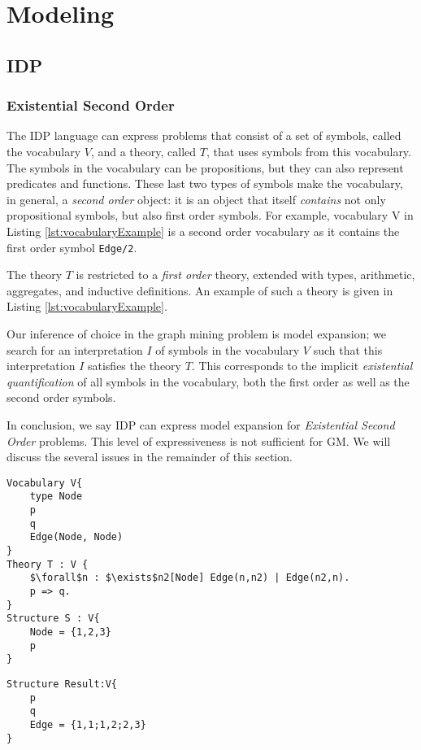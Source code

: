\section{Modeling}\label{sec:modeling}
\subsection{IDP}
\subsubsection{Existential Second Order}
The IDP language can express problems that consist of a set of symbols, called the vocabulary $V$, and a theory, called $T$, that uses symbols from this vocabulary.
The symbols in the vocabulary can be propositions, but they can also represent predicates and functions.
These last two types of symbols make the vocabulary, in general, a \emph{second order} object: it is an object that itself \emph{contains} not only propositional symbols, but also first order symbols.
For example, vocabulary V in Listing \ref{lst:vocabularyExample} is a second order vocabulary as it contains the first order symbol \lstinline{Edge/2}.

The theory $T$ is restricted to a \emph{first order} theory, extended with types, arithmetic, aggregates, and inductive definitions.
An example of such a theory is given in Listing \ref{lst:vocabularyExample}.

Our inference of choice in the graph mining problem is model expansion; we search for an interpretation $I$ of symbols in the vocabulary $V$ such that this interpretation $I$ satisfies the theory $T$.
This corresponds to the implicit \emph{existential quantification} of all symbols in the vocabulary, both the first order as well as the second order symbols.

In conclusion, we say IDP can express model expansion for \emph{Existential Second Order} problems.
This level of expressiveness is not sufficient for GM.
We will discuss the several issues in the remainder of this section.

\begin{lstlisting}[mathescape,basicstyle=\fontfamily{lmvtt}\selectfont,caption=\ldots, label=lst:vocabularyExample]
Vocabulary V{
    type Node
    p
    q
    Edge(Node, Node)
}
Theory T : V {
    $\forall$n : $\exists$n2[Node] Edge(n,n2) | Edge(n2,n).
    p => q.
}
Structure S : V{
    Node = {1,2,3}
    p
}
\end{lstlisting}
\begin{lstlisting}
Structure Result:V{
    p
    q
    Edge = {1,1;1,2;2,3}
}
\end{lstlisting}


